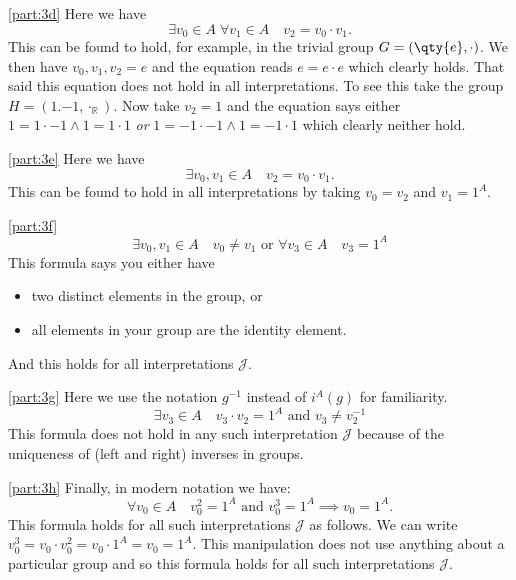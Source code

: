 \documentclass[boxes,pages,color=CornflowerBlue]{homework}
\begin{document}
\begin{solution}
    \ref{part:3d}
    Here we have
    \begin{equation*}
        \exists v_0\in A \; \forall v_1 \in A \quad v_2 = v_0 \cdot v_1.
    \end{equation*}
    This can be found to hold, for example, in the trivial group $G = (\qty{e}, \cdot)$.
    We then have $v_0, v_1, v_2 = e$ and the equation reads $e = e\cdot e$ which clearly holds.
    That said this equation does not hold in all interpretations.
    To see this take the group $H = (\qty{1, -1}, \cdot_\mathbb{R})$.
    Now take $v_2 = 1$ and the equation says either $1 = 1 \cdot -1 \wedge 1 = 1\cdot 1$ \emph{or} $1 = -1\cdot -1 \wedge 1 = -1\cdot 1$ which clearly neither hold.

    \ref{part:3e}
    Here we have
    \begin{equation*}
        \exists v_0, v_1 \in A \quad v_2 = v_0 \cdot v_1.
    \end{equation*}
    This can be found to hold in all interpretations by taking $v_0 = v_2$ and $v_1 = 1^A$.

    \ref{part:3f}
    \begin{equation*}
        \exists v_0, v_1 \in A \quad v_0 \neq v_1 \text{ or } \forall v_3 \in A \quad v_3 = 1^A
    \end{equation*}
    This formula says you either have
    \begin{itemize}[topsep=6pt,itemsep=0pt,partopsep=4pt,parsep=2pt]
        \item two distinct elements in the group, or
        \item all elements in your group are the identity element.
    \end{itemize}
    And this holds for all interpretations $\mathcal{J}$.

    \ref{part:3g}
    Here we use the notation $g^{-1}$ instead of $i^A(g)$ for familiarity.
    \begin{equation*}
        \exists v_3 \in A \quad v_3\cdot v_2 = 1^A \text{ and } v_3 \neq v_2^{-1}
    \end{equation*}
    This formula does not hold in any such interpretation $\mathcal{J}$ because of the uniqueness of (left and right) inverses in groups.

    \ref{part:3h}
    Finally, in modern notation we have:
    \begin{equation*}
        \forall v_0 \in A \quad v_0^2 = 1^A \text{ and } v_0^3 = 1^A \implies v_0 = 1^A.
    \end{equation*}
    This formula holds for all such interpretations $\mathcal{J}$ as follows.
    We can write $v_0^3 = v_0\cdot v_0^2 = v_0 \cdot 1^A = v_0 = 1^A$.
    This manipulation does not use anything about a particular group and so this formula holds for all such interpretations $\mathcal{J}$.
\end{solution}
\end{document}
